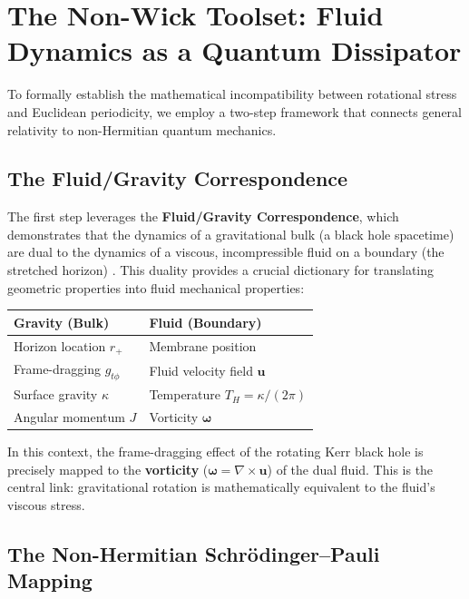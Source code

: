 \documentclass[11pt]{article}
\begin{document}
\section{The Non-Wick Toolset: Fluid Dynamics as a Quantum Dissipator}

To formally establish the mathematical incompatibility between rotational stress and Euclidean periodicity, we employ a two-step framework that connects general relativity to non-Hermitian quantum mechanics.

\subsection{The Fluid/Gravity Correspondence\cite{FluidGravity2008}}

The first step leverages the \textbf{Fluid/Gravity Correspondence\cite{FluidGravity2008}}, which demonstrates that the dynamics of a gravitational bulk (a black hole spacetime) are dual to the dynamics of a viscous, incompressible fluid on a boundary (the stretched horizon) \cite{FluidGravity2008}. This duality provides a crucial dictionary for translating geometric properties into fluid mechanical properties:

\begin{center}
\begin{tabular}{|l|l|}
\hline
\textbf{Gravity (Bulk)} & \textbf{Fluid (Boundary)} \\
\hline
Horizon location $r_+$ & Membrane position \\
Frame-dragging $g_{t\phi}$ & Fluid velocity field $\mathbf{u}$ \\
Surface gravity $\kappa$ & Temperature $T_H = \kappa/(2\pi)$ \\
Angular momentum $J$ & Vorticity $\mathbf{\omega}$ \\
\hline
\end{tabular}
\end{center}

In this context, the frame-dragging effect of the rotating Kerr black hole \cite{Kerr1963} is precisely mapped to the \textbf{vorticity} ($\mathbf{\omega} = \nabla \times \mathbf{u}$) of the dual fluid. This is the central link: gravitational rotation is mathematically equivalent to the fluid's viscous stress.

\subsection{The Non-Hermitian Schr\"odinger--Pauli Mapping}
\end{document}
